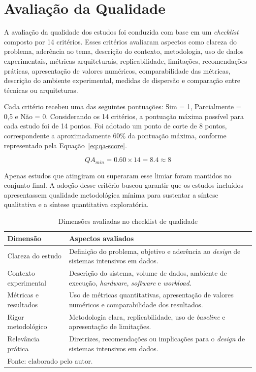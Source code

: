 \section{Avaliação da Qualidade}
\label{sec:rsl-qualidade}

A avaliação da qualidade dos estudos foi conduzida com base em um \textit{checklist} composto por 14 critérios. Esses critérios avaliaram aspectos como clareza do problema, aderência ao tema, descrição do contexto, metodologia, uso de dados experimentais, métricas arquiteturais, replicabilidade, limitações, recomendações práticas, apresentação de valores numéricos, comparabilidade das métricas, descrição do ambiente experimental, medidas de dispersão e comparação entre técnicas ou arquiteturas.

Cada critério recebeu uma das seguintes pontuações: Sim = 1, Parcialmente = 0,5 e Não = 0. Considerando os 14 critérios, a pontuação máxima possível para cada estudo foi de 14 pontos. Foi adotado um ponto de corte de 8 pontos, correspondente a aproximadamente 60\% da pontuação máxima, conforme representado pela Equação~\ref{eq:qa-score}.

\begin{equation}
QA_{min} = 0.60 \times 14 = 8.4 \approx 8
\label{eq:qa-score}
\end{equation}

Apenas estudos que atingiram ou superaram esse limiar foram mantidos no conjunto final. A adoção desse critério buscou garantir que os estudos incluídos apresentassem qualidade metodológica mínima para sustentar a síntese qualitativa e a síntese quantitativa exploratória.

\begin{table}[htbp]
\centering
\caption{Dimensões avaliadas no checklist de qualidade}
\label{tab:dimensoes-qualidade}
\small
\setlength{\tabcolsep}{6pt}
\renewcommand{\arraystretch}{1.3}
\begin{tabular}{p{4cm} p{8cm}}
\toprule
\textbf{Dimensão} & \textbf{Aspectos avaliados} \\ 
\midrule
Clareza do estudo & Definição do problema, objetivo e aderência ao \textit{design} de sistemas intensivos em dados. \\ 
Contexto experimental & Descrição do sistema, volume de dados, ambiente de execução, \textit{hardware}, \textit{software} e \textit{workload}. \\ 
Métricas e resultados & Uso de métricas quantitativas, apresentação de valores numéricos e comparabilidade dos resultados. \\ 
Rigor metodológico & Metodologia clara, replicabilidade, uso de \textit{baseline} e apresentação de limitações. \\ 
Relevância prática & Diretrizes, recomendações ou implicações para o \textit{design} de sistemas intensivos em dados. \\ 
\bottomrule
\multicolumn{2}{l}{\footnotesize Fonte: elaborado pelo autor.}
\end{tabular}
\end{table}

